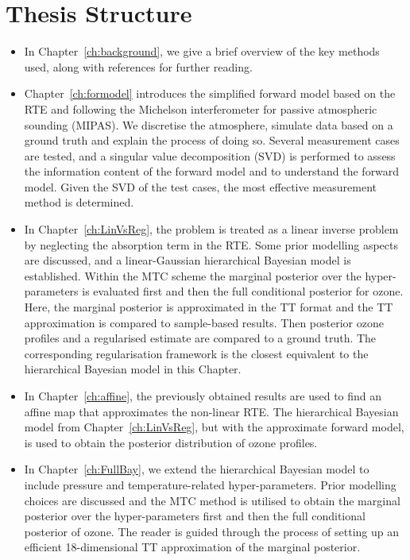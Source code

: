 \section{Thesis Structure}
\begin{itemize}
	\item In Chapter~\ref{ch:background}, we give a brief overview of the key methods used, along with references for further reading.
	\item Chapter~\ref{ch:formodel} introduces the simplified forward model based on the RTE and following the Michelson interferometer for passive atmospheric sounding (MIPAS).
	We discretise the atmosphere, simulate data based on a ground truth and explain the process of doing so.
	Several measurement cases are tested, and a singular value decomposition (SVD) is performed to assess the information content of the forward model and to understand the forward model.
	Given the SVD of the test cases, the most effective measurement method is determined.
	\item In Chapter~\ref{ch:LinVsReg}, the problem is treated as a linear inverse problem by neglecting the absorption term in the RTE. Some prior modelling aspects are discussed, and a linear-Gaussian hierarchical Bayesian model is established.
	Within the MTC scheme the marginal posterior over the hyper-parameters is evaluated first and then the full conditional posterior for ozone.
	Here, the marginal posterior is approximated in the TT format and the TT approximation is compared to sample-based results.
	Then posterior ozone profiles and a regularised estimate are compared to a ground truth.
	The corresponding regularisation framework is the closest equivalent to the hierarchical Bayesian model in this Chapter.
	\item In Chapter~\ref{ch:affine}, the previously obtained results are used to find an affine map that approximates the non-linear RTE. The hierarchical Bayesian model from Chapter~\ref{ch:LinVsReg}, but with the approximate forward model, is used to obtain the posterior distribution of ozone profiles.
	\item In Chapter~\ref{ch:FullBay}, we extend the hierarchical Bayesian model to include pressure and temperature-related hyper-parameters.
	Prior modelling choices are discussed and the MTC method is utilised to obtain the marginal posterior over the hyper-parameters first and then the full conditional posterior of ozone.
	The reader is guided through the process of setting up an efficient 18-dimensional TT approximation of the marginal posterior.

\end{itemize}
